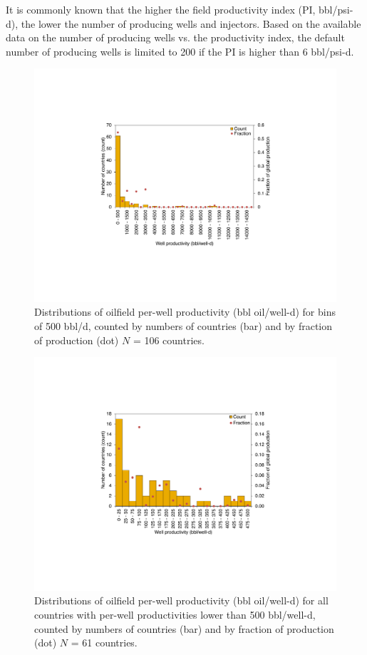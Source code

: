 \documentclass[11pt]{report}
\begin{document}
It is commonly known that the higher the field productivity index (PI, bbl/psi-d), the lower the number of producing wells and injectors. Based on the available data on the number of producing wells vs. the productivity index, the default number of producing wells is limited to 200 if the PI is higher than 6 bbl/psi-d. 

\begin{figure}[t]
\includegraphics[width=0.8\columnwidth]{images/well_prod_all.pdf}
\caption{Distributions of oilfield per-well productivity (bbl oil/well-d) for bins of 500 bbl/d, counted by numbers of countries (bar) and by fraction of production (dot) $N$ = 106 countries.}
\label{fig:productivity_distribution_all}
\end{figure}

\begin{figure}[t]
\includegraphics[width=0.8\columnwidth]{images/well_prod_low.pdf}
\caption{Distributions of oilfield per-well productivity (bbl oil/well-d) for all countries with per-well productivities lower than 500 bbl/well-d, counted by numbers of countries (bar) and by fraction of production (dot) $N$ = 61 countries.}
\label{fig:productivity_distribution_low}
\end{figure}
\end{document}
